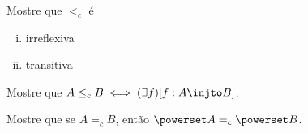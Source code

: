 \begin{exercise}
    Mostre que $<_c$ é
    \begin{enumerate}[(i)]
        \item irreflexiva
        \item transitiva
    \end{enumerate}
\end{exercise}

\begin{exercise}
    Mostre que $A \leq_c B \iff (\exists f)[f : A \injto B]$.
\end{exercise}

\begin{exercise}
    Mostre que se $A =_c B$, então $\powerset A =_c \powerset B$.
\end{exercise}
